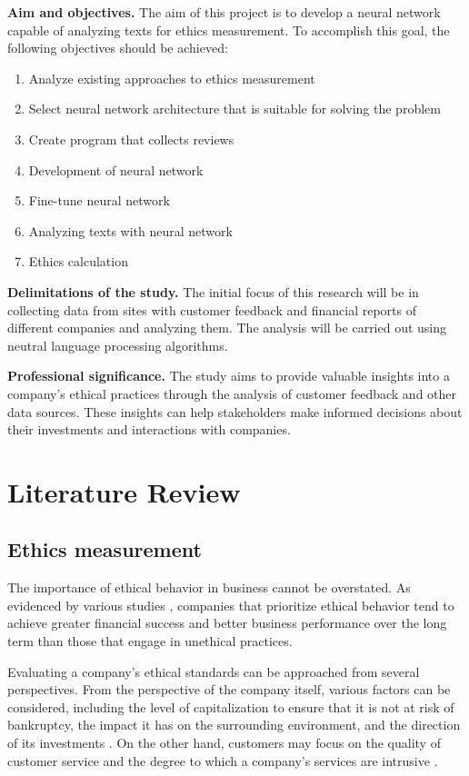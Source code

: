 \documentclass[PI]{ProjectProposal}
\begin{document}
\textbf{Aim and objectives.} The aim of this project is to develop a neural network capable of analyzing texts for ethics measurement. To accomplish this goal, the following objectives should be achieved:
\begin{enumerate}
\item Analyze existing approaches to ethics measurement
\item Select neural network architecture that is suitable for solving the problem
\item Create program that collects reviews
\item Development of neural network
\item Fine-tune neural network
\item Analyzing texts with neural network
\item Ethics calculation
\end{enumerate}

\textbf{Delimitations of the study.} The initial focus of this research will be in collecting data from sites with customer feedback and financial reports of different companies and analyzing them. The analysis will be carried out using neutral language processing algorithms.

\textbf{Professional significance.} The study aims to provide valuable insights into a company's ethical practices through the analysis of customer feedback and other data sources. These insights can help stakeholders make informed decisions about their investments and interactions with companies.
\chapter{Literature Review}
\label{sec:org5a6c46b}
\section{Ethics measurement}
\label{sec:orgc197f6b}
The importance of ethical behavior in business cannot be overstated. As evidenced by various studies \autocites{climent_ethical_2018}[][]{mure_esg_2021}, companies that prioritize ethical behavior tend to achieve greater financial success and better business performance over the long term than those that engage in unethical practices.

Evaluating a company's ethical standards can be approached from several perspectives. From the perspective of the company itself, various factors can be considered, including the level of capitalization to ensure that it is not at risk of bankruptcy, the impact it has on the surrounding environment, and the direction of its investments \autocite{harvey1995ethical}. On the other hand, customers may focus on the quality of customer service \autocite{brunk2010exploring} and the degree to which a company's services are intrusive \autocite{mitchell1992bank}.
\end{document}
